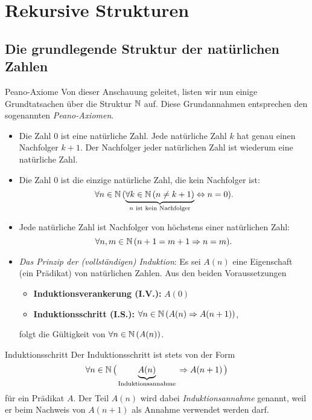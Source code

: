 \section{Rekursive Strukturen}

\subsection{Die grundlegende Struktur der natürlichen Zahlen}

\begin{concept}{Peano-Axiome}
    Von dieser Anschauung geleitet, listen wir nun einige Grundtatsachen über die Struktur $\mathbb{N}$ auf. Diese Grundannahmen entsprechen den sogenannten \textit{Peano-Axiomen}.

    \begin{itemize}
        \item Die Zahl $0$ ist eine natürliche Zahl. Jede natürliche Zahl $k$ hat genau einen Nachfolger $k+1$. Der Nachfolger jeder natürlichen Zahl ist wiederum eine natürliche Zahl.
        \item Die Zahl $0$ ist die einzige natürliche Zahl, die kein Nachfolger ist:
            \[
                \forall n\in\mathbb{N}\,(\underbrace{\forall k\in\mathbb{N}\,(n\neq k+1)}_{n\text{ ist kein Nachfolger}}\Leftrightarrow n=0 ).
            \]
        \item Jede natürliche Zahl ist Nachfolger von höchstens einer natürlichen Zahl:
            \[
                \forall n,m\in\mathbb{N}\,(n+1=m+1\Rightarrow n=m).
            \]
        \item \textit{Das Prinzip der (vollständigen) Induktion}: Es sei $A(n)$ eine Eigenschaft (ein Prädikat) von natürlichen Zahlen. Aus den beiden Voraussetzungen
            \begin{itemize}
                \item[] \textbf{Induktionsverankerung (I.V.):} $A(0)$
                \item[] \textbf{Induktionsschritt (I.S.):} $\forall n\in \mathbb{N}\,(A(n)\Rightarrow A(n+1))$,
            \end{itemize}
            folgt die Gültigkeit von $\forall n\in\mathbb{N}\,(A(n))$.
    \end{itemize}
\end{concept}

\begin{lemma}{Induktionsschritt}
    Der Induktionsschritt ist stets von der Form
    \[
        \forall n\in\mathbb{N}\,\big( \underbrace{A(n)}_{\text{Induktionsannahme}}\,\Rightarrow A(n+1)\,\big)
    \]
    für ein Prädikat $A$. Der Teil $A(n)$ wird dabei \textit{Induktionsannahme} genannt, weil er beim Nachweis von $A(n+1)$ als Annahme verwendet werden darf.
\end{lemma}

